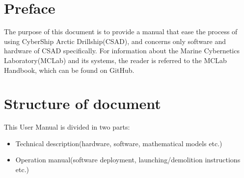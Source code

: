 \section*{Preface}
The purpose of this document is to provide a manual that ease the process of using CyberShip Arctic Drillship(CSAD), and concerns only software and hardware of CSAD specifically. For information about the Marine Cybernetics Laboratory(MCLab) and its systems, the reader is referred to the MCLab Handbook, which can be found on GitHub. 

\section*{Structure of document}
This User Manual is divided in two parts: 
\begin{itemize}
	\item Technical description(hardware, software, mathematical models etc.)
	\item Operation manual(software deployment, launching/demolition instructions etc.)
\end{itemize}
